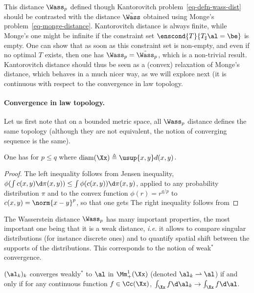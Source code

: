 This distance $\Wass_p$ defined though Kantorovitch problem~\eqref{eq-defn-wass-dist} should be contrasted with the distance $\tilde\Wass$ obtained using Monge's problem~\eqref{eq-monge-distance}. Kantorovitch distance is always finite, while Monge's one might be infinite if the constraint set $\enscond{T}{T_\sharp \al=\be}$ is empty. One can show that as soon as this constraint set is non-empty, and even if no optimal $T$ exists, then one has $\Wass_p = \tilde\Wass_p$, which is a non-trivial result. Kantorovitch distance should thus be seen as a (convex) relaxation of Monge's distance, which behaves in a much nicer way, as we will explore next (it is continuous with respect to the convergence in law topology.


\paragraph{Convergence in law topology.}

Let us first note that on a bounded metric space, all $\Wass_p$ distance defines the same topology (although they are not equivalent, the notion of converging sequence is the same).

\begin{prop}\label{prop-comp-wass-p}
	One has for $p \leq q$
	where $\text{\upshape diam}(\Xx) \triangleq \usup{x,y} d(x,y)$.
\end{prop}
\begin{proof}
	The left inequality follows from Jensen inequality, $\phi(\int c(x,y) \d\pi(x,y)) \leq \int \phi(c(x,y)) \d\pi(x,y)$, applied to any probability distribution $\pi$ and to the convex function $\phi(r)=r^{q/p}$ to $c(x,y)=\norm{x-y}^p$, so that one gets
	The right inequality follows from
\end{proof}

The Wasserstein distance $\Wass_p$ has many important properties, the most important one being that it is a weak distance, \emph{i.e.} it allows to compare singular distributions (for instance discrete ones) and to quantify spatial shift between the supports of the distributions. This corresponds to the notion of weak$^*$ convergence.

\begin{defn}\label{dfn-weak-conv}
	$(\al_k)_k$ converges weakly$^*$ to $\al$ in $\Mm_+^1(\Xx)$ (denoted $\al_k \rightharpoonup \al$) if and only if for any continuous function $f \in \Cc(\Xx)$, $\int_\Xx f \d\al_k \rightarrow \int_\Xx f \d\al$.
\end{defn}

